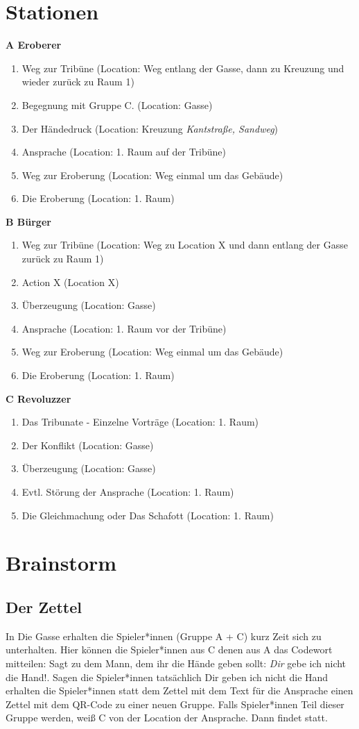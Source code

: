 \documentclass[a4paper, 12pt]{report}
\begin{document}
\section*{Stationen}
\textbf{A Eroberer}
\begin{enumerate}
    \item Weg zur Tribüne (Location: Weg entlang der Gasse, dann zu Kreuzung und wieder zurück zu Raum 1)
    \item Begegnung mit Gruppe C. (Location: Gasse)
    \item Der Händedruck (Location: Kreuzung \textit{Kantstraße, Sandweg})
    \item Ansprache (Location: 1. Raum auf der Tribüne)
    \item Weg zur Eroberung (Location: Weg einmal um das Gebäude)
    \item Die Eroberung (Location: 1. Raum)
\end{enumerate}
\textbf{B Bürger}
\begin{enumerate}
    \item Weg zur Tribüne (Location: Weg zu Location X und dann entlang der Gasse zurück zu Raum 1)
    \item Action X (Location X)
    \item Überzeugung (Location: Gasse)
    \item Ansprache (Location: 1. Raum vor der Tribüne)
    \item Weg zur Eroberung (Location: Weg einmal um das Gebäude)
    \item Die Eroberung (Location: 1. Raum)
\end{enumerate}
\textbf{C Revoluzzer}
\begin{enumerate}
    \item Das Tribunate - Einzelne Vorträge (Location: 1. Raum)
    \item Der Konflikt (Location: Gasse)
    \item Überzeugung (Location: Gasse)
    \item Evtl. Störung der Ansprache (Location: 1. Raum)
    \item Die Gleichmachung oder Das Schafott  (Location: 1. Raum)
\end{enumerate}

\section*{Brainstorm}

\subsection*{Der Zettel}
In \glqq Die Gasse\grqq{} erhalten die Spieler*innen (Gruppe A + C) kurz Zeit sich zu unterhalten.
Hier können die Spieler*innen aus C denen aus A das Codewort mitteilen:
\glqq Sagt zu dem Mann, dem ihr die Hände geben sollt: \glq \textit{Dir} gebe ich nicht die Hand!\grq\grqq.
Sagen die Spieler*innen tatsächlich \glqq Dir geben ich nicht die Hand\grqq{} erhalten die Spieler*innen statt dem Zettel mit dem Text für die Ansprache einen Zettel mit dem QR-Code zu einer neuen Gruppe.
Falls Spieler*innen Teil dieser Gruppe werden, weiß C von der Location der Ansprache.
Dann findet  statt.
\end{document}

